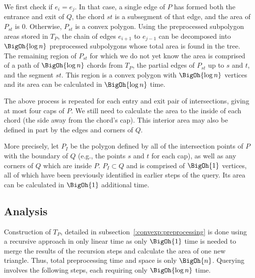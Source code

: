 We first check if $e_i = e_j$.
In that case, a single edge of $P$ has formed both the entrance and exit of $Q$, the chord $st$ is a subsegment of that edge, and the area of $P_{st}$ is 0.
Otherwise, $P_{st}$ is a convex polygon.
Using the preprocessed subpolygon areas stored in $T_P$, the chain of edges $e_{i+1}$ to $e_{j-1}$ can be decomposed into $\BigOh{\log{n}}$ preprocessed subpolygons whose total area is found in the tree.
The remaining region of $P_{st}$ for which we do not yet know the area is comprised of a path of $\BigOh{\log{n}}$ chords from $T_P$, the partial edges of $P_{st}$ up to $s$ and $t$, and the segment $st$.
This region is a convex polygon with $\BigOh{\log{n}}$ vertices and its area can be calculated in $\BigOh{\log{n}}$ time.

The above process is repeated for each entry and exit pair of intersections, giving at most four caps of $P$.
We still need to calculate the area to the inside of each chord (the side away from the chord's cap).
This interior area may also be defined in part by the edges and corners of $Q$. 

More precisely, let $P_I$ be the polygon defined by all of the intersection  points of $P$ with the boundary of $Q$ (e.g., the points $s$ and $t$ for each cap), as well as any corners of $Q$ which are inside $P$. $P_I \subset Q$ and is comprised of $\BigOh{1}$ vertices, all of which have been previously identified in earlier steps of the query. Its area can be calculated in $\BigOh{1}$ additional time.


\subsection{Analysis}
\label{:convexp:analysis}

Construction of $T_P$, detailed in subsection~\ref{:convexp:preprocessing} is done using a recursive approach in only linear time as only $\BigOh{1}$ time is needed to merge the results of the recursion steps and calculate the area of one new triangle. 
Thus, total preprocessing time and space is only $\BigOh{n}$.
Querying involves the following steps, each requiring only $\BigOh{\log{n}}$ time.


